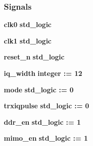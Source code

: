 \subsubsection*{Signals}
 \begin{DoxyCompactItemize}
\item 
{\bf clk0} {\bfseries \textcolor{comment}{std\+\_\+logic}\textcolor{vhdlchar}{ }} 
\item 
{\bf clk1} {\bfseries \textcolor{comment}{std\+\_\+logic}\textcolor{vhdlchar}{ }} 
\item 
{\bf reset\+\_\+n} {\bfseries \textcolor{comment}{std\+\_\+logic}\textcolor{vhdlchar}{ }} 
\item 
{\bf iq\+\_\+width} {\bfseries \textcolor{comment}{integer}\textcolor{vhdlchar}{ }\textcolor{vhdlchar}{ }\textcolor{vhdlchar}{\+:}\textcolor{vhdlchar}{=}\textcolor{vhdlchar}{ }\textcolor{vhdlchar}{ } \textcolor{vhdldigit}{12} \textcolor{vhdlchar}{ }} 
\item 
{\bf mode} {\bfseries \textcolor{comment}{std\+\_\+logic}\textcolor{vhdlchar}{ }\textcolor{vhdlchar}{ }\textcolor{vhdlchar}{\+:}\textcolor{vhdlchar}{=}\textcolor{vhdlchar}{ }\textcolor{vhdlchar}{ }\textcolor{vhdlchar}{\textquotesingle{}}\textcolor{vhdlchar}{ } \textcolor{vhdldigit}{0} \textcolor{vhdlchar}{ }\textcolor{vhdlchar}{\textquotesingle{}}\textcolor{vhdlchar}{ }} 
\item 
{\bf trxiqpulse} {\bfseries \textcolor{comment}{std\+\_\+logic}\textcolor{vhdlchar}{ }\textcolor{vhdlchar}{ }\textcolor{vhdlchar}{\+:}\textcolor{vhdlchar}{=}\textcolor{vhdlchar}{ }\textcolor{vhdlchar}{ }\textcolor{vhdlchar}{\textquotesingle{}}\textcolor{vhdlchar}{ } \textcolor{vhdldigit}{0} \textcolor{vhdlchar}{ }\textcolor{vhdlchar}{\textquotesingle{}}\textcolor{vhdlchar}{ }} 
\item 
{\bf ddr\+\_\+en} {\bfseries \textcolor{comment}{std\+\_\+logic}\textcolor{vhdlchar}{ }\textcolor{vhdlchar}{ }\textcolor{vhdlchar}{\+:}\textcolor{vhdlchar}{=}\textcolor{vhdlchar}{ }\textcolor{vhdlchar}{ }\textcolor{vhdlchar}{\textquotesingle{}}\textcolor{vhdlchar}{ } \textcolor{vhdldigit}{1} \textcolor{vhdlchar}{ }\textcolor{vhdlchar}{\textquotesingle{}}\textcolor{vhdlchar}{ }} 
\item 
{\bf mimo\+\_\+en} {\bfseries \textcolor{comment}{std\+\_\+logic}\textcolor{vhdlchar}{ }\textcolor{vhdlchar}{ }\textcolor{vhdlchar}{\+:}\textcolor{vhdlchar}{=}\textcolor{vhdlchar}{ }\textcolor{vhdlchar}{ }\textcolor{vhdlchar}{\textquotesingle{}}\textcolor{vhdlchar}{ } \textcolor{vhdldigit}{1} \textcolor{vhdlchar}{ }\textcolor{vhdlchar}{\textquotesingle{}}\textcolor{vhdlchar}{ }} 

\end{DoxyCompactItemize}
